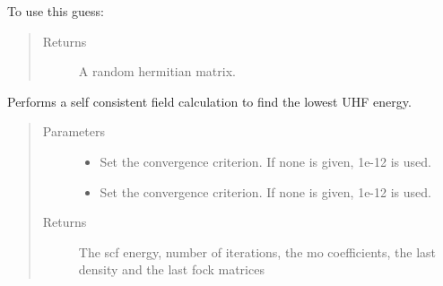 \documentclass[letterpaper,10pt,english]{sphinxmanual}
\begin{document}
\begin{fulllineitems}
\begin{fulllineitems}
To use this guess:

\begin{sphinxVerbatim}[commandchars=\\\{\}]
          
   
  
\end{sphinxVerbatim}
\begin{quote}\begin{description}
\item[{Returns}] \leavevmode
A random hermitian matrix.

\end{description}\end{quote}

\end{fulllineitems}


\begin{fulllineitems}
\label{\detokenize{cUHF_b:hf.cUHF_b.CUHF.scf}}
Performs a self consistent field calculation to find the lowest UHF energy.
\begin{quote}\begin{description}
\item[{Parameters}] \leavevmode\begin{itemize}
\item {} 
 \textendash{} Set the convergence criterion. If none is given, 1e-12 is used.

\item {} 
 \textendash{} Set the convergence criterion. If none is given, 1e-12 is used.

\end{itemize}

\item[{Returns}] \leavevmode
The scf energy, number of iterations, the mo coefficients, the last density and the last fock matrices

\end{description}\end{quote}

\end{fulllineitems}


\end{fulllineitems}
\end{document}
